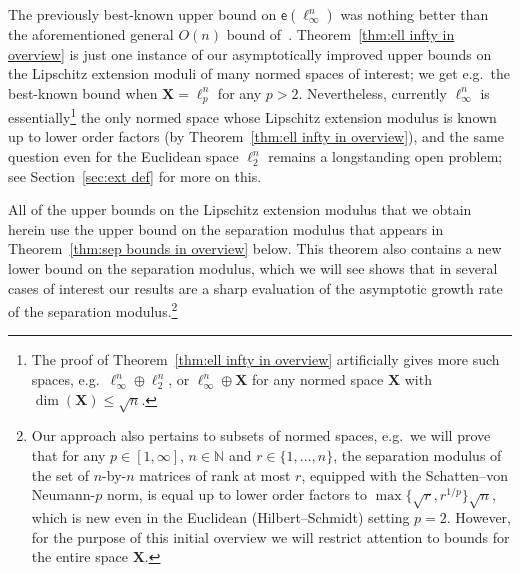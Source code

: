 \documentclass[11pt,reqno]{amsart}
\renewcommand{\le}{\leqslant}
\newcommand{\n}{\{1,\ldots,n\}}
\newcommand{\X}{\mathbf X}
\theoremstyle{remark}
\newcommand{\N}{\mathbb N}
\newcommand{\ee}{\mathsf{e}}
\renewcommand{\1}{\mathbf 1}
\begin{document}
The previously best-known upper bound on $\ee(\ell_\infty^n)$ was nothing better than the aforementioned general $O(n)$ bound of~\cite{JLS86}. Theorem~\ref{thm:ell infty in overview} is just one instance of our asymptotically improved upper bounds on the Lipschitz extension moduli of many normed spaces of interest; we get e.g.~the best-known bound when $\X=\ell_p^n$ for any $p>2$. Nevertheless, currently $\ell_\infty^n$ is essentially\footnote{The proof of Theorem~\ref{thm:ell infty in overview} artificially gives more such spaces, e.g.~$\ell_\infty^n\oplus \ell_2^n$, or $\ell_\infty^n\oplus \X$ for any normed space $\X$ with $\dim(\X)\le \sqrt{n}$. } the only normed space whose Lipschitz extension modulus is known  up to lower order factors (by Theorem~\ref{thm:ell infty in overview}),  and the same question even for the Euclidean space $\ell_2^n$ remains a longstanding open problem; see Section~\ref{sec:ext def} for more on this.





All of the upper bounds on the Lipschitz extension modulus that we obtain herein use the upper bound on the separation modulus that appears in Theorem~\ref{thm:sep bounds in overview} below. This theorem also contains a new lower bound on the separation modulus, which we will see shows that in several cases of interest our results are a sharp evaluation of the asymptotic growth rate of the separation modulus.\footnote{Our approach also pertains to subsets of normed spaces, e.g.~we will prove that for any $p\in [1,\infty]$, $n\in \N$ and $r\in \n$, the separation modulus of the set of $n$-by-$n$ matrices of rank at most $r$, equipped with the Schatten--von Neumann-$p$ norm, is equal up to lower order factors to $\max\{\sqrt{r},r^{1/p}\}\sqrt{n}$, which is new even in the Euclidean (Hilbert--Schmidt) setting $p=2$. However, for the purpose of   this initial overview we will restrict attention to bounds for the entire space $\X$.}
\end{document}
